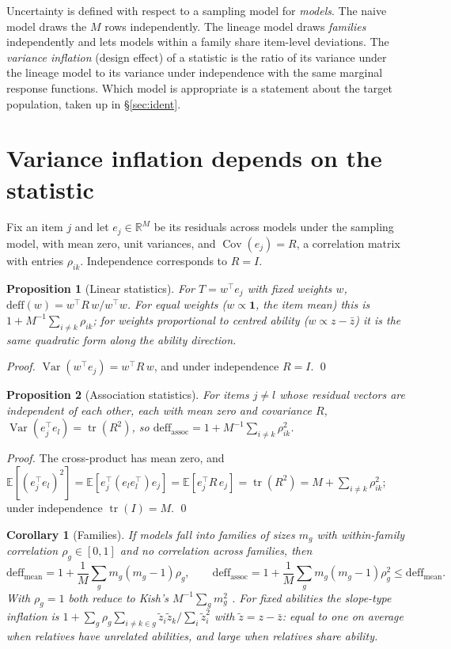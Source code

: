\documentclass[10pt]{article}
\newtheorem{proposition}{Proposition}
\newtheorem{corollary}{Corollary}
\theoremstyle{remark}\newtheorem{remark}{Remark}
\DeclareMathOperator{\Var}{Var}
\DeclareMathOperator{\Cov}{Cov}
\DeclareMathOperator{\tr}{tr}
\newcommand{\deff}{\mathrm{deff}}
\begin{document}
Uncertainty is defined with respect to a sampling model for \emph{models}. The
naive model draws the $M$ rows independently. The lineage model draws
\emph{families} independently and lets models within a family share
item-level deviations. The \emph{variance inflation} (design effect) of a
statistic is the ratio of its variance under the lineage model to its variance
under independence with the same marginal response functions. Which model is
appropriate is a statement about the target population, taken up in
\S\ref{sec:ident}.

\section{Variance inflation depends on the statistic}\label{sec:theory}
Fix an item $j$ and let $e_j\in\mathbb R^M$ be its residuals across models
under the sampling model, with mean zero, unit variances, and
$\Cov(e_j)=R$, a correlation matrix with entries $\rho_{ik}$. Independence
corresponds to $R=I$.

\begin{proposition}[Linear statistics]\label{prop:linear}
For $T=w^\top e_j$ with fixed weights $w$,
$\deff(w)=w^\top R\,w/w^\top w$. For equal weights ($w\propto\mathbf 1$, the
item mean) this is $1+M^{-1}\sum_{i\ne k}\rho_{ik}$; for weights proportional
to centred ability ($w\propto z-\bar z$) it is the same quadratic form along
the ability direction.
\end{proposition}
\noindent\emph{Proof.} $\Var(w^\top e_j)=w^\top R\,w$, and under independence
$R=I$. \qed

\begin{proposition}[Association statistics]\label{prop:assoc}
For items $j\neq l$ whose residual vectors are independent of each other,
each with mean zero and covariance $R$,
$\Var(e_j^\top e_l)=\tr(R^2)$, so
$\deff_{\mathrm{assoc}}=1+M^{-1}\sum_{i\ne k}\rho_{ik}^2$.
\end{proposition}
\noindent\emph{Proof.} The cross-product has mean zero, and
$\mathbb E[(e_j^\top e_l)^2]=\mathbb E[e_j^\top(e_le_l^\top)e_j]
=\mathbb E[e_j^\top R\,e_j]=\tr(R^2)=M+\sum_{i\ne k}\rho_{ik}^2$; under
independence $\tr(I)=M$. \qed

\begin{corollary}[Families]\label{cor:families}
If models fall into families of sizes $m_g$ with within-family correlation
$\rho_g\in[0,1]$ and no correlation across families, then
\[
\deff_{\mathrm{mean}}=1+\frac1M\sum_g m_g(m_g-1)\rho_g,\qquad
\deff_{\mathrm{assoc}}=1+\frac1M\sum_g m_g(m_g-1)\rho_g^2
\le\deff_{\mathrm{mean}} .
\]
With $\rho_g=1$ both reduce to Kish's $M^{-1}\sum_g m_g^2$
\citep{kish1965survey}. For fixed abilities the slope-type inflation is
$1+\sum_g\rho_g\sum_{i\ne k\in g}\tilde z_i\tilde z_k/\sum_i\tilde z_i^2$ with
$\tilde z=z-\bar z$: equal to one on average when relatives have unrelated
abilities, and large when relatives share ability.
\end{corollary}
\end{document}
